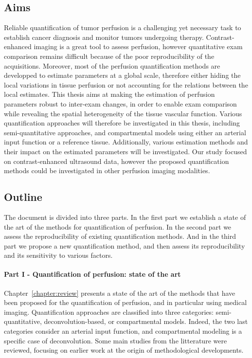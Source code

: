 \subsection{Aims}
Reliable quantification of tumor perfusion is a challenging yet necessary task to establish cancer diagnosis and monitor tumors undergoing therapy.
Contrast-enhanced imaging is a great tool to assess perfusion, however quantitative exam comparison remains difficult because of the poor reproducibility of the acquisitions.
Moreover, most of the perfusion quantification methods are developped to estimate parameters at a global scale, therefore either hiding the local variations in tissue perfusion or not accounting for the relations between the local estimates.
This thesis aims at making the estimation of perfusion parameters robust to inter-exam changes, in order to enable exam comparison while revealing the spatial heterogeneity of the tissue vascular function.
Various quantification approaches will therefore be investigated in this thesis, including semi-quantitative approaches, and compartmental models using either an arterial input function or a reference tissue.
Additionally, various estimation methods and their impact on the estimated parameters will be investigated.
Our study focused on contrast-enhanced ultrasound data, however the proposed quantification methods could be investigated in other perfusion imaging modalities.

\subsection{Outline}
The document is divided into three parts. 
In the first part we establish a state of the art of the methods for quantification of perfusion.
In the second part we assess the reproducibility of existing quantification methods.
And in the third part we propose a new quantification method, and then assess its reproducibility and its sensitivity to various factors.

\paragraph{Part I - Quantification of perfusion: state of the art}
Chapter~\ref{chapter:review} presents a state of the art of the methods that have been proposed for the quantification of perfusion, and in particular using medical imaging.
Quantification approaches are classified into three categories: semi-quantitative, deconvolution-based, or compartmental models.
Indeed, the two last categories consider an arterial input function, and compartmental modeling is a specific case of deconvolution.
Some main studies from the litterature were reviewed, focusing on earlier work at the origin of methodological developments.


